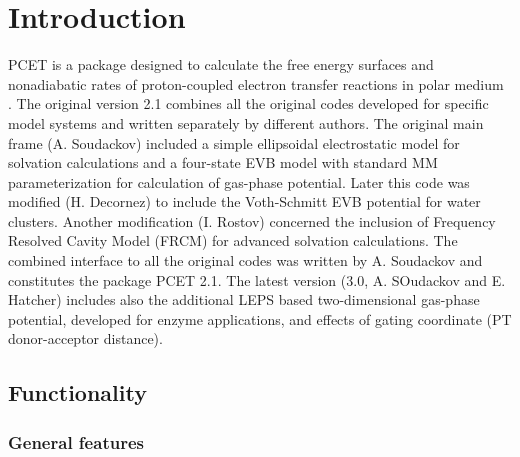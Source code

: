 \documentclass[oneside,11pt,openany]{book}
\begin{document}
\chapter{Introduction}
PCET is a package designed to calculate the free energy surfaces
and nonadiabatic rates of proton-coupled electron transfer reactions in
polar medium \cite{pcet-jcp1,pcet-jacs,pcet-jcp2,pcet-jpc}. The original
version 2.1 combines all the original codes developed for specific model
systems and written separately by different authors. The original
main frame (A. Soudackov) included a simple ellipsoidal electrostatic
model for solvation calculations and a four-state EVB model with
standard MM parameterization for calculation of gas-phase potential.
Later this code was modified (H. Decornez) to include the Voth-Schmitt
EVB potential for water clusters. Another modification (I. Rostov)
concerned the inclusion of Frequency Resolved Cavity Model (FRCM) for
advanced solvation calculations. The combined interface to all the
original codes was written by A. Soudackov and constitutes the package
PCET 2.1. The latest version (3.0, A. SOudackov and E. Hatcher) includes
also the additional LEPS based two-dimensional gas-phase potential,
developed for enzyme applications, and effects of gating coordinate
(PT donor-acceptor distance).

\section{Functionality}

\subsection{General features}
\end{document}
